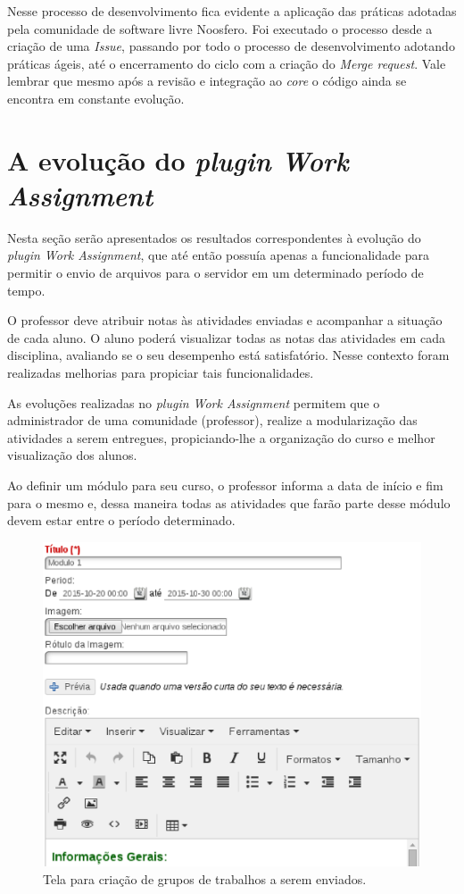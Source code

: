 Nesse processo de desenvolvimento fica evidente a aplicação das práticas adotadas pela comunidade de software livre Noosfero. Foi executado o processo desde a criação de uma \textit{Issue}, passando por todo o processo de desenvolvimento adotando práticas ágeis, até o encerramento do ciclo com a criação do \textit{Merge request}. Vale lembrar que mesmo após a revisão e integração ao \textit{core} o código ainda se encontra em constante evolução.

\section{A evolução do \textit{plugin Work Assignment}}

Nesta seção serão apresentados os resultados correspondentes à evolução do \textit{plugin Work Assignment}, que até então possuía apenas a funcionalidade para permitir o envio de arquivos para o servidor em um determinado período de tempo.

O professor deve atribuir notas às atividades enviadas e acompanhar a situação de cada aluno. O aluno poderá visualizar todas as notas das atividades em cada disciplina, avaliando se o seu desempenho está satisfatório. Nesse contexto foram realizadas melhorias para propiciar tais funcionalidades.

As evoluções realizadas no \textit{plugin Work Assignment} permitem que o administrador de uma comunidade (professor), realize a modularização das atividades a serem entregues, propiciando-lhe a organização do curso e melhor visualização dos alunos.

Ao definir um módulo para seu curso, o professor informa a data de início e fim para o mesmo e, dessa maneira todas as atividades que farão parte desse módulo devem estar entre o período determinado.

\begin{figure}[h]
    \centering
    \includegraphics[keepaspectratio=true,scale=0.6]
      {figuras/work-assignment-group.eps}
    \caption{Tela para criação de grupos de trabalhos a serem enviados.}
    \label{fig:work-assignment-group}
\end{figure}

